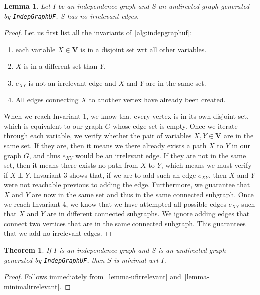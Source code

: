 \documentclass{amsart}
\theoremstyle{plain}
\newcounter{dummy-def}\numberwithin{dummy-def}{section}
\newcounter{dummy-thm}\numberwithin{dummy-thm}{section}
\newtheorem{theorem}[dummy-thm]{Theorem}
\newcounter{dummy-prop}\numberwithin{dummy-prop}{section}
\newcounter{dummy-corollary}\numberwithin{dummy-corollary}{section}
\newcounter{dummy-lemma}\numberwithin{dummy-lemma}{section}
\newtheorem{lemma}[dummy-lemma]{Lemma}
\newcounter{dummy-ex}\numberwithin{dummy-ex}{section}
\newcounter{dummy-eg}\numberwithin{dummy-eg}{section}
\numberwithin{equation}{section}
\newcommand{\set}[1]{\mathbf{#1}}
\newcommand{\code}[1]{\lstinline[mathescape=true]{#1}}
\begin{document}
\begin{lemma}\label{lemma-ufirrelevant}
  Let $I$ be an independence graph and $S$ an undirected graph generated by \code{IndepGraphUF}.
  $S$ has no irrelevant edges.
\end{lemma}
\begin{proof}
  Let us first list all the invariants of~\autoref{alg:indepgraphuf}:\\
  \begin{minipage}[t]{\linegoal}
    \begin{enumerate}[label=\textbf{Invariant \arabic*:},leftmargin=*]
      \item each variable $X\in\set{V}$ is in a disjoint set wrt all other variables.
      \item $X$ is in a different set than $Y$.
      \item $e_{XY}$ is not an irrelevant edge and $X$ and $Y$ are in the same set.
      \item All edges connecting $X$ to another vertex have already been created.
    \end{enumerate}
  \end{minipage}
  When we reach Invariant 1, we know that every vertex is in its own disjoint set, which is
  equivalent to our graph $G$ whose edge set is empty. Once we iterate through each variable,
  we verify whether the pair of variables $X,Y\in\set{V}$ are in the same set. If they are, then it
  means we there already exists a path $X$ to $Y$ in our graph $G$, and thus $e_{XY}$ would be an
  irrelevant edge. If they are not in the same set, then it means there exists no path from $X$ to
  $Y$, which means we must verify if $X\perp Y$. Invariant 3 shows that, if we are to add such an
  edge $e_{XY}$, then $X$ and $Y$ were not reachable previous to adding the edge. Furthermore, we
  guarantee that $X$ and $Y$ are now in the same set and thus in the same connected subgraph. Once
  we reach Invariant 4, we know that we have attempted all possible edges $e_{XY}$ such that $X$
  and $Y$ are in different connected subgraphs. We ignore adding edges that connect two vertices
  that are in the same connected subgraph. This guarantees that we add no irrelevant edges.
\end{proof}

\begin{theorem} If $I$ is an independence graph and $S$ is an undirected graph generated by
  \code{IndepGraphUF}, then $S$ is minimal wrt $I$.
\end{theorem}
\begin{proof}
  Follows immediately from~\autoref{lemma-ufirrelevant} and~\autoref{lemma-minimalirrelevant}.
\end{proof}
\end{document}
